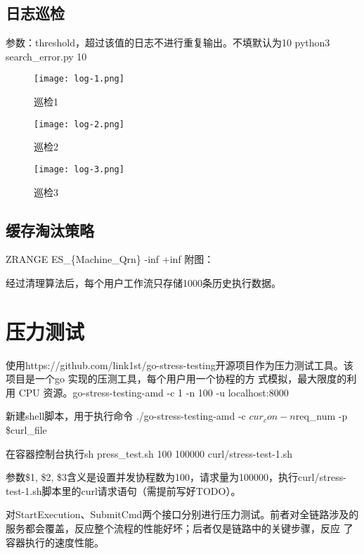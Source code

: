 \subsection{日志巡检}

参数：threshold，超过该值的日志不进行重复输出。不填默认为10
python3 search\_error.py 10

\begin{figure}
    \centering
    \texttt{[image: log-1.png]}
    \caption{巡检1}
    \label{fig:6-4-1}
\end{figure}

\begin{figure}
    \centering
    \texttt{[image: log-2.png]}
    \caption{巡检2}
    \label{fig:6-4-2}
\end{figure}

\begin{figure}
    \centering
    \texttt{[image: log-3.png]}
    \caption{巡检3}
    \label{fig:6-4-3}
\end{figure}

\subsection{缓存淘汰策略}
ZRANGE ES\_\{Machine\_Qrn\} -inf +inf
附图：

经过清理算法后，每个用户工作流只存储1000条历史执行数据。


\section{压力测试}


使用https://github.com/link1st/go-stress-testing开源项目作为压力测试工具。该项目是一个go 实现的压测工具，每个用户用一个协程的方
式模拟，最大限度的利用 CPU 资源。go-stress-testing-amd -c 1 -n 100 -u localhost:8000

新建shell脚本，用于执行命令 ./go-stress-testing-amd -c $cur_con -n $req\_num -p \$curl\_file

在容器控制台执行sh press\_test.sh 100 100000 curl/stress-test-1.sh

参数\$1, \$2, \$3含义是设置并发协程数为100，请求量为100000，执行curl/stress-test-1.sh脚本里的curl请求语句（需提前写好TODO）。

对StartExecution、SubmitCmd两个接口分别进行压力测试。前者对全链路涉及的服务都会覆盖，反应整个流程的性能好坏；后者仅是链路中的关键步骤，反应
了容器执行的速度性能。


